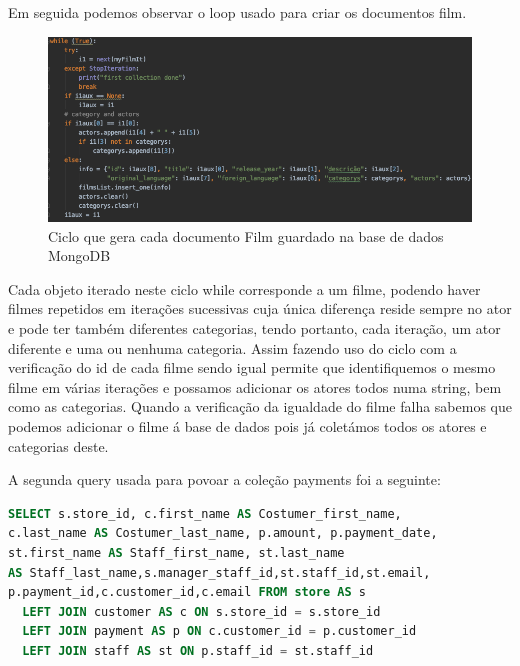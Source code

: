 \par Em seguida podemos observar o loop usado para criar os documentos film.\newline
\begin{figure}[H]

  \centering

  \includegraphics[scale = 0.45]{ciclo.png}

  \caption {Ciclo que gera cada documento Film guardado na base de dados MongoDB}

  \label {fig1}

\end{figure}

\par Cada objeto iterado neste ciclo while corresponde a um filme, podendo haver filmes repetidos em iterações sucessivas cuja única diferença reside sempre no ator e pode ter também diferentes categorias, tendo portanto, cada iteração, um ator diferente e uma ou nenhuma categoria. Assim fazendo uso do ciclo com a verificação do id de cada filme sendo igual permite que identifiquemos o mesmo filme em várias iterações e possamos adicionar os atores todos numa string, bem como as categorias. Quando a verificação da igualdade do filme falha sabemos que podemos adicionar o filme á base de dados pois já coletámos todos os atores e categorias deste.

A segunda query usada para povoar a coleção payments foi a seguinte:

\begin{lstlisting}[language=sql,caption=Query para povoar a segunda coleção]
SELECT s.store_id, c.first_name AS Costumer_first_name,
c.last_name AS Costumer_last_name, p.amount, p.payment_date, 
st.first_name AS Staff_first_name, st.last_name  
AS Staff_last_name,s.manager_staff_id,st.staff_id,st.email,
p.payment_id,c.customer_id,c.email FROM store AS s 
  LEFT JOIN customer AS c ON s.store_id = s.store_id 
  LEFT JOIN payment AS p ON c.customer_id = p.customer_id 
  LEFT JOIN staff AS st ON p.staff_id = st.staff_id
\end{lstlisting}

